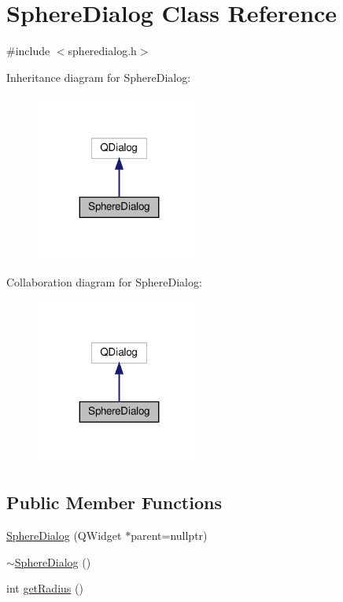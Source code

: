 \hypertarget{class_sphere_dialog}{}\section{Sphere\+Dialog Class Reference}
\label{class_sphere_dialog}


{\ttfamily \#include $<$spheredialog.\+h$>$}



Inheritance diagram for Sphere\+Dialog\+:
\nopagebreak
\begin{figure}[H]
\begin{center}
\leavevmode
\includegraphics[width=155pt]{class_sphere_dialog__inherit__graph}
\end{center}
\end{figure}


Collaboration diagram for Sphere\+Dialog\+:
\nopagebreak
\begin{figure}[H]
\begin{center}
\leavevmode
\includegraphics[width=155pt]{class_sphere_dialog__coll__graph}
\end{center}
\end{figure}
\subsection*{Public Member Functions}
\begin{DoxyCompactItemize}
\item 
\hyperlink{class_sphere_dialog_a27970d61eb4311914b22aa3cb22e9750}{Sphere\+Dialog} (Q\+Widget $\ast$parent=nullptr)
\item 
\hyperlink{class_sphere_dialog_aaf6160cf0bb93b2a044b471f34e650ea}{$\sim$\+Sphere\+Dialog} ()
\item 
int \hyperlink{class_sphere_dialog_af78dddeb66fb74be6e749a94c3b81fb3}{get\+Radius} ()
\end{DoxyCompactItemize}


